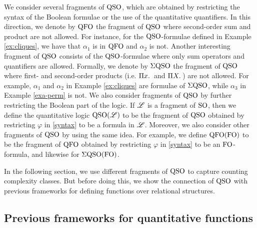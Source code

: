 We consider several fragments of ${\rm QSO}$, which are obtained by restricting the syntax of the Boolean formulae or the use of the quantitative quantifiers.
In this direction, we denote by ${\rm QFO}$ the fragment of ${\rm QSO}$ where second-order sum and product are not allowed. 
For instance, for the ${\rm QSO}$-formulae defined in Example \ref{ex:cliques}, we have that $\alpha_1$ is in ${\rm QFO}$ and $\alpha_2$ is not.
Another interesting fragment of ${\rm QSO}$ consists of the ${\rm QSO}$-formulae where only sum operators and quantifiers are allowed. 
Formally, we denote by $\Sigma{\rm QSO}$ the fragment of ${\rm QSO}$ where first- and second-order products (i.e. $\Pi{x}.\,$ and $\Pi{X}.\,$) are not allowed.
For example, $\alpha_1$ and $\alpha_2$ in Example \ref{ex:cliques} are formulae of $\Sigma{\rm QSO}$, while $\alpha_3$ in Example \ref{exa-perm} is not. 
We also consider fragments of ${\rm QSO}$ by further restricting the Boolean part of the logic.
If $\mathscr{L}$ is a fragment of ${\rm SO}$, then we define the quantitative logic ${\rm QSO}(\mathscr{L})$ to be the fragment of ${\rm QSO}$ obtained by restricting $\varphi$ in \eqref{syntax} to be a formula in $\mathscr{L}$. Moreover, we also consider other fragments of ${\rm QSO}$ by using the same idea. 
For example, we define ${\rm QFO}({\rm FO})$ to be the fragment of ${\rm QFO}$ obtained by restricting $\varphi$ in \eqref{syntax} to be an ${\rm FO}$-formula, and likewise for $\Sigma{\rm QSO}({\rm FO})$.


In the following section, we use different fragments of ${\rm QSO}$ to capture counting complexity classes. 
But before doing this, we 
show the connection of ${\rm QSO}$ with previous frameworks for defining functions over relational structures.

\subsection{Previous frameworks for quantitative functions} \label{sec:previous}

